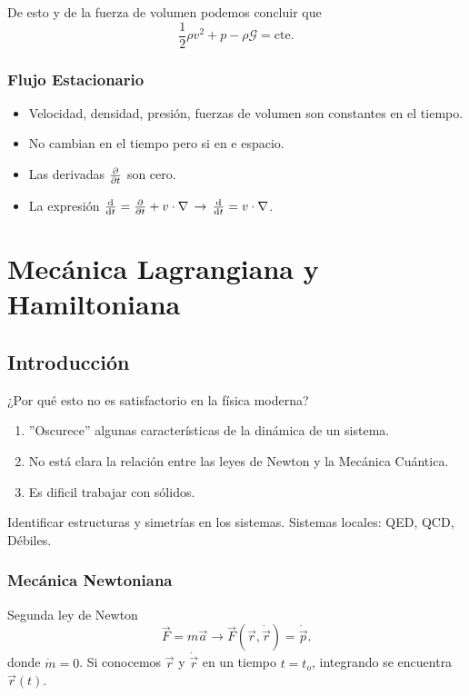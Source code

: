 De esto y de la fuerza de volumen podemos concluir que 
\begin{equation}
	\frac{1}{2} \rho v^2 + p - \rho \mathcal{G} = \text{cte}.
\end{equation}

\subsection{Flujo Estacionario}
\begin{itemize}
	\item Velocidad, densidad, presión, fuerzas de volumen son constantes en el tiempo.
	\item No cambian en el tiempo pero si en e espacio.
	\item Las derivadas $\pdv{t}$ son cero.
	\item La expresión $\dv{t} = \pdv{t} + v\cdot \nabla \, \to \, \dv{t} = v\cdot \nabla$.
\end{itemize}






\chapter{Mecánica Lagrangiana y Hamiltoniana}

\section{Introducción}
¿Por qué esto no es satisfactorio en la física moderna?
\begin{enumerate}
	\item ''Oscurece'' algunas características de la dinámica de un sistema.
	\item No está clara la relación entre las leyes de Newton y la Mecánica Cuántica.
	\item Es dificil trabajar con sólidos.
\end{enumerate}

Identificar estructuras y simetrías en los sistemas. Sistemas locales: QED, QCD, Débiles.


\subsection{Mecánica Newtoniana}
Segunda ley de Newton
\begin{equation}
	\vec{F} = m\vec{a} \longrightarrow \vec{F} (\vec{r}, \dot{\vec{r}}) = \dot{\vec{p}}.
\end{equation}
donde $\dot{m} = 0$. Si conocemos $\vec{r}$ y $\dot{\vec{r}}$ en un tiempo $t=t_o$, integrando se encuentra $\vec{r} (t)$.

